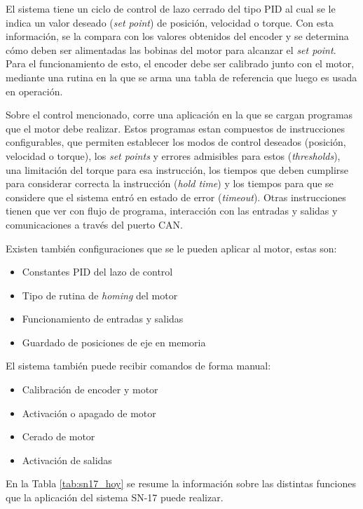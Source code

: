 El sistema tiene un ciclo de control de lazo cerrado del tipo PID\citep{paper_PID_steppers} al cual se le indica un valor deseado (\textit{set point}) de posición, velocidad o torque. Con esta información, se la compara con los valores obtenidos del encoder y se determina cómo deben ser alimentadas las bobinas del motor para alcanzar el \textit{set point}. Para el funcionamiento de esto, el encoder debe ser calibrado junto con el motor, mediante una rutina en la que se arma una tabla de referencia que luego es usada en operación.

Sobre el control mencionado, corre una aplicación en la que se cargan programas que el motor debe realizar. Estos programas estan compuestos de instrucciones configurables, que permiten establecer los modos de control deseados (posición, velocidad o torque), los \textit{set points} y errores admisibles para estos (\textit{thresholds}), una limitación del torque para esa instrucción, los tiempos que deben cumplirse para considerar correcta la instrucción (\textit{hold time}) y los tiempos para que se considere que el sistema entró en estado de error (\textit{timeout}). Otras instrucciones tienen que ver con flujo de programa, interacción con las entradas y salidas y comunicaciones a través del puerto CAN.

Existen también configuraciones que se le pueden aplicar al motor, estas son:
\begin{itemize}
	\item Constantes PID del lazo de control
	\item Tipo de rutina de \textit{homing} del motor
	\item Funcionamiento de entradas y salidas
	\item Guardado de posiciones de eje en memoria
\end{itemize}

El sistema también puede recibir comandos de forma manual:
\begin{itemize}
	\item Calibración de encoder y motor
	\item Activación o apagado de motor
	\item Cerado de motor
	\item Activación de salidas
\end{itemize}

En la Tabla \ref{tab:sn17_hoy} se resume la información sobre las distintas funciones que la aplicación del sistema SN-17 puede realizar.

